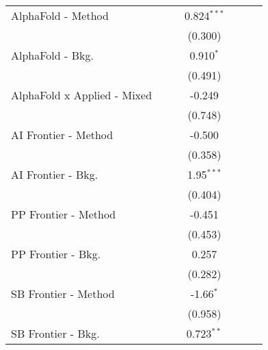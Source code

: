 \begin{tabular}{lcccccc}
   AlphaFold - Method             &               &              & 0.824$^{***}$ &               &        &   \\   
                                  &               &              & (0.300)       &               &        &   \\   
   AlphaFold - Bkg.               &               &              & 0.910$^{*}$   &               &        &   \\   
                                  &               &              & (0.491)       &               &        &   \\   
   AlphaFold x Applied - Mixed    &               &              & -0.249        &               &        &   \\   
                                  &               &              & (0.748)       &               &        &   \\   
   AI Frontier - Method           &               &              & -0.500        &               &        &   \\   
                                  &               &              & (0.358)       &               &        &   \\   
   AI Frontier - Bkg.             &               &              & 1.95$^{***}$  &               &        &   \\   
                                  &               &              & (0.404)       &               &        &   \\   
   PP Frontier - Method           &               &              & -0.451        &               &        &   \\   
                                  &               &              & (0.453)       &               &        &   \\   
   PP Frontier - Bkg.             &               &              & 0.257         &               &        &   \\   
                                  &               &              & (0.282)       &               &        &   \\   
   SB Frontier - Method           &               &              & -1.66$^{*}$   &               &        &   \\   
                                  &               &              & (0.958)       &               &        &   \\   
   SB Frontier - Bkg.             &               &              & 0.723$^{**}$  &               &        &   \\   

\end{tabular}
